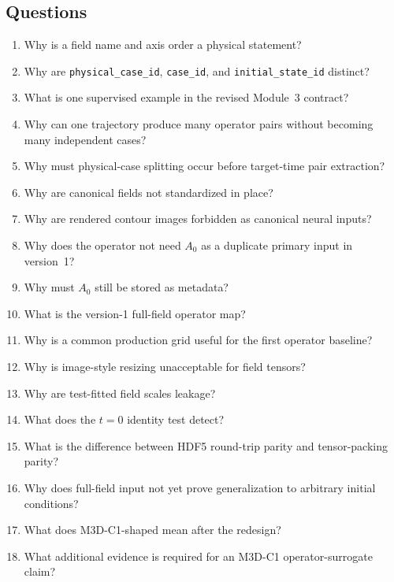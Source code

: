 \documentclass[11pt]{article}
\newcommand{\code}[1]{\texttt{#1}}
\begin{document}
\subsection*{Questions}
\begin{enumerate}[label=\textbf{Q\arabic*.}]
  \item Why is a field name and axis order a physical statement?
  \item Why are \code{physical\_case\_id}, \code{case\_id}, and \code{initial\_state\_id} distinct?
  \item What is one supervised example in the revised Module~3 contract?
  \item Why can one trajectory produce many operator pairs without becoming many independent cases?
  \item Why must physical-case splitting occur before target-time pair extraction?
  \item Why are canonical fields not standardized in place?
  \item Why are rendered contour images forbidden as canonical neural inputs?
  \item Why does the operator not need $A_0$ as a duplicate primary input in version~1?
  \item Why must $A_0$ still be stored as metadata?
  \item What is the version-1 full-field operator map?
  \item Why is a common production grid useful for the first operator baseline?
  \item Why is image-style resizing unacceptable for field tensors?
  \item Why are test-fitted field scales leakage?
  \item What does the $t=0$ identity test detect?
  \item What is the difference between HDF5 round-trip parity and tensor-packing parity?
  \item Why does full-field input not yet prove generalization to arbitrary initial conditions?
  \item What does M3D-C1-shaped mean after the redesign?
  \item What additional evidence is required for an M3D-C1 operator-surrogate claim?
\end{enumerate}
\end{document}
